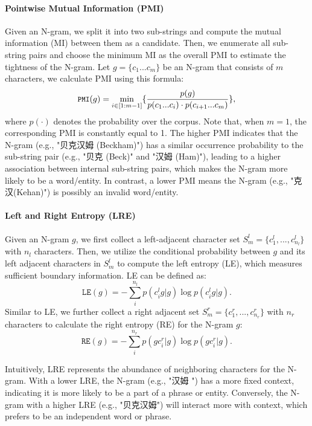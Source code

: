 \documentclass[11pt]{article}
\begin{document}
\begin{CJK}{UTF8}{gbsn}
\paragraph{Pointwise Mutual Information (PMI)}
Given an N-gram, we split it into two sub-strings and compute the mutual information (MI) between them as a candidate.
Then, we enumerate all sub-string pairs and choose the minimum MI as the overall PMI to estimate the tightness of the N-gram.
Let $g = \{c_1 ... c_m\}$ be an N-gram that consists of $m$ characters, we calculate PMI using this formula:
\begin{equation}
  \label{eq:PMI}
  \small
  \texttt{PMI}(g) = \min_{i\in[1:m-1]} \{ \frac{p(g)}{p(c_1...c_i) \cdot p(c_{i+1}...c_m)} \},
\end{equation}
where $p(\cdot)$ denotes the probability over the corpus.
Note that, when $m = 1$, the corresponding PMI is constantly equal to 1.
The higher PMI indicates that the N-gram (e.g., "贝克汉姆 (Beckham)")
has a similar occurrence probability to the sub-string pair (e.g., "贝克 (Beck)" and "汉姆 (Ham)"),
leading to a higher association between internal sub-string pairs,
which makes the N-gram more likely to be a word/entity.
In contrast, a lower PMI means the N-gram (e.g., "克汉(Kehan)") is possibly an invalid word/entity.





\paragraph{Left and Right Entropy (LRE)}
Given an N-gram $g$, we first collect a left-adjacent character set $S_m^l=\{c_1^l, ..., c_{n_l}^l \}$ with $n_l$ characters.
Then, we utilize the conditional probability between $g$ and its left adjacent characters in $S_m^l$ to compute the left entropy (LE),
which measures sufficient boundary information.
LE can be defined as:
\begin{equation}
  \label{eq:le}
\texttt{LE}(g) = -{\sum}_{i}^{n_l} p(c^l_i g | g) \log p(c^l_i g | g).
\end{equation}
Similar to LE, we further collect a right adjacent set $S_m^{r} = \{c^r_1,...,c^r_{n_r}  \}$ with $n_r$ characters to calculate the right entropy (RE) for the N-gram $g$:
\begin{equation}
  \label{eq:re}
\texttt{RE}(g) = -{\sum}_{i}^{n_r} p(g c^r_i | g) \log p(g c^r_i | g).
\end{equation}


Intuitively, LRE represents the abundance of neighboring characters for the N-gram.
With a lower LRE, the N-gram (e.g., "汉姆 ") has a more fixed context,
indicating it is more likely to be a part of a phrase or entity.
Conversely, the N-gram with a higher LRE (e.g., "贝克汉姆") will interact more with context, which prefers to be an independent word or phrase.



\end{CJK}
\end{document}
